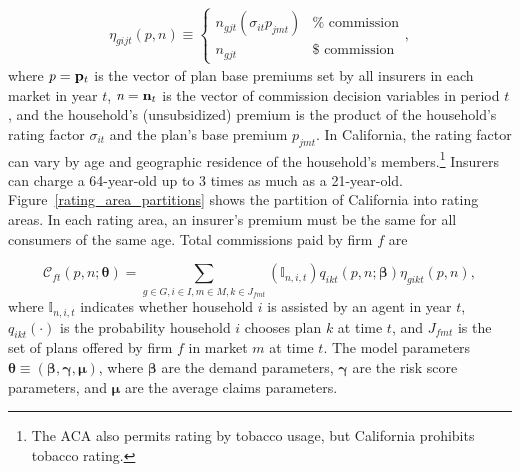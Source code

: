 \documentclass[12pt]{article}
\begin{document}
\vspace{-0.4in}		
\singlespacing			
\begin{eqnarray*}
	\eta_{gijt}(\textit{p},\textit{n})  \equiv 
	\begin{cases} 
		n_{gjt} \left(\sigma_{it}p_{jmt}\right) & \mathrm{\% \,\, commission} \\		
		n_{gjt} & \mathrm{\$ \,\, commission}
    \end{cases},
\end{eqnarray*}
\doublespacing
\noindent where $\textit{p} = {\bf p}_t$ is the vector of plan base premiums set by all insurers in each market in year $t$, $\textit{n} = {\bf n}_t$ is the vector of commission decision variables in period $t$, and the household's (unsubsidized) premium is the product of the household's rating factor $\sigma_{it}$  and the plan's base premium $p_{jmt}$. In California, the rating factor can vary by age and geographic residence of the household's members.\footnote{The ACA also permits rating by tobacco usage, but California prohibits tobacco rating.}  Insurers can charge a 64-year-old up to 3 times as much as a 21-year-old. Figure~\ref{rating_area_partitions} shows the partition of California into rating areas.  In each rating area,  an insurer's premium must be the same for all consumers of the same age. Total commissions paid by firm $f$  are		
	
\vspace{-0.2in}		
\begin{equation*}
    \mathcal{C}_{ft}(\textit{p},\textit{n};\boldsymbol{\theta}) = \sum_{g \in G, i \in I, m\in M, k \in J_{fmt}} \left( \mathbb{I}_{n,i,t} \right)  q_{ikt}(\textit{p},\textit{n};\boldsymbol{\beta}) \eta_{gikt}(\textit{p},\textit{n}),
\end{equation*}
where $\mathbb{I}_{n,i,t}$ indicates whether household $i$ is assisted by an agent in year $t$, $q_{ikt}(\cdot)$ is the probability household $i$ chooses plan $k$ at time $t$, and $J_{fmt}$ is the set of plans offered by firm $f$ in market $m$ at time $t$.  The model parameters $\boldsymbol{\theta} \equiv (\boldsymbol{\beta},\boldsymbol{\gamma},\boldsymbol{\mu})$, where $\boldsymbol{\beta}$ are the demand parameters, $\boldsymbol{\gamma}$ are the risk score parameters, and $\boldsymbol{\mu}$ are the average claims parameters.
\end{document}
